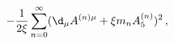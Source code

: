 \begin{equation}
-\frac{1}{2\xi} \sum_{n=0}^\infty (\d_\mu A^{(n)\mu} + \xi m_n
A_5^{(n)})^2 \, , \label{KKgaugefixing}
\end{equation}

